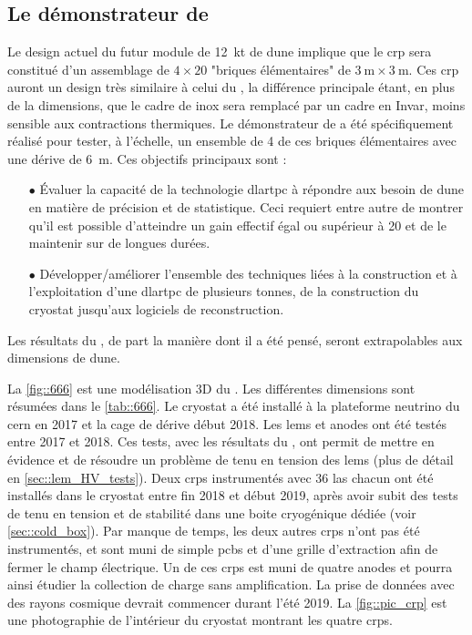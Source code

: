     \subsection{Le démonstrateur de \SSS{}}

      Le design actuel du futur module de \SI{12}{\kilo\tonne}\cite{Acciarri2016a} de \gls{dune} implique que le \gls{crp} sera constitué d'un assemblage de $4\times20$ "briques élémentaires" de $\SI{3}{\meter}\times\SI{3}{\meter}$. Ces \gls{crp} auront un design très similaire à celui du \TOO{}, la différence principale étant, en plus de la dimensions, que le cadre de inox sera remplacé par un cadre en Invar, moins sensible aux contractions thermiques. Le démonstrateur de \SSS{} a été spécifiquement réalisé pour tester, à l'échelle, un ensemble de 4 de ces briques élémentaires avec une dérive de \SI{6}{\meter}. Ces objectifs principaux sont :
      \begin{itemize}
        \item[$\bullet$] Évaluer la capacité de la technologie \gls{dlartpc} à répondre aux besoin de \gls{dune} en matière de précision et de statistique. Ceci requiert entre autre de montrer qu'il est possible d'atteindre un gain effectif égal ou supérieur à 20 et de le maintenir sur de longues durées.
        \item[$\bullet$] Développer/améliorer l'ensemble des techniques liées à la construction et à l'exploitation d'une \gls{dlartpc} de plusieurs tonnes, de la construction du cryostat jusqu'aux logiciels de reconstruction.
      \end{itemize}
      Les résultats du \SSS{}, de part la manière dont il a été pensé, seront extrapolables aux dimensions de \gls{dune}.

      La \autoref{fig::666} est une modélisation 3D du \SSS{}. Les différentes dimensions sont résumées dans le \autoref{tab::666}. Le cryostat a été installé à la plateforme neutrino du \gls{cern} en 2017 et la cage de dérive début 2018. Les \glspl{lem} et anodes ont été testés entre 2017 et 2018. Ces tests, avec les résultats du \TOO{}, ont permit de mettre en évidence et de résoudre un problème de tenu en tension des \glspl{lem} (plus de détail en \autoref{sec::lem_HV_tests}). Deux \glspl{crp} instrumentés avec 36 \gls{las} chacun ont été installés dans le cryostat entre fin 2018 et début 2019, après avoir subit des tests de tenu en tension et de stabilité dans une boite cryogénique dédiée (voir \autoref{sec::cold_box}). Par manque de temps, les deux autres \glspl{crp} n'ont pas été instrumentés, et sont muni de simple \glspl{pcb} et d'une grille d'extraction afin de fermer le champ électrique. Un de ces \glspl{crp} est muni de quatre anodes et pourra ainsi étudier la collection de charge sans amplification. La prise de données avec des rayons cosmique devrait commencer durant l'été 2019. La \autoref{fig::pic_crp} est une photographie de l'intérieur du cryostat montrant les quatre \glspl{crp}.

      
\printbibliography